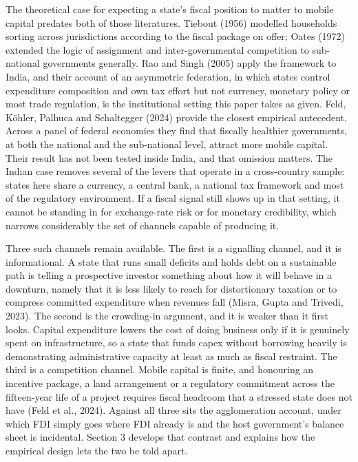 \documentclass[12pt,a4paper]{article}
\begin{document}
The theoretical case for expecting a state's fiscal position to matter to mobile capital predates both of those literatures. Tiebout (1956) modelled households sorting across jurisdictions according to the fiscal package on offer; Oates (1972) extended the logic of assignment and inter-governmental competition to sub-national governments generally. Rao and Singh (2005) apply the framework to India, and their account of an asymmetric federation, in which states control expenditure composition and own tax effort but not currency, monetary policy or most trade regulation, is the institutional setting this paper takes as given. Feld, Köhler, Palhuca and Schaltegger (2024) provide the closest empirical antecedent. Across a panel of federal economies they find that fiscally healthier governments, at both the national and the sub-national level, attract more mobile capital. Their result has not been tested inside India, and that omission matters. The Indian case removes several of the levers that operate in a cross-country sample: states here share a currency, a central bank, a national tax framework and most of the regulatory environment. If a fiscal signal still shows up in that setting, it cannot be standing in for exchange-rate risk or for monetary credibility, which narrows considerably the set of channels capable of producing it.

Three such channels remain available. The first is a signalling channel, and it is informational. A state that runs small deficits and holds debt on a sustainable path is telling a prospective investor something about how it will behave in a downturn, namely that it is less likely to reach for distortionary taxation or to compress committed expenditure when revenues fall (Misra, Gupta and Trivedi, 2023). The second is the crowding-in argument, and it is weaker than it first looks. Capital expenditure lowers the cost of doing business only if it is genuinely spent on infrastructure, so a state that funds capex without borrowing heavily is demonstrating administrative capacity at least as much as fiscal restraint. The third is a competition channel. Mobile capital is finite, and honouring an incentive package, a land arrangement or a regulatory commitment across the fifteen-year life of a project requires fiscal headroom that a stressed state does not have (Feld et al., 2024). Against all three sits the agglomeration account, under which FDI simply goes where FDI already is and the host government's balance sheet is incidental. Section 3 develops that contrast and explains how the empirical design lets the two be told apart.
\end{document}
